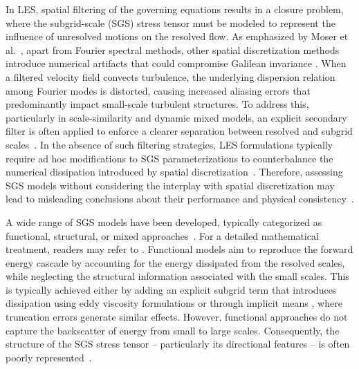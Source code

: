 \documentclass[final,3p]{elsarticle}
\begin{document}
In LES, spatial filtering of the governing equations results in a closure problem, where the subgrid-scale (SGS) stress tensor must be modeled to represent the influence of unresolved motions on the resolved flow. As emphasized by Moser et al.~\cite{moser2021statistical}, apart from Fourier spectral methods, other spatial discretization methods introduce numerical artifacts that could compromise Galilean invariance \cite{moser2021statistical,pletcher2012computational,pope2001turbulent,sagaut2005large}. When a filtered velocity field convects turbulence, the underlying dispersion relation among Fourier modes is distorted, causing increased aliasing errors that predominantly impact small-scale turbulent structures. To address this, particularly in scale-similarity and dynamic mixed models, an explicit secondary filter is often applied to enforce a clearer separation between resolved and subgrid scales~\cite{bardina1983improved, armenio2000lagrangian, zang1993dynamic}. In the absence of such filtering strategies, LES formulations typically require ad hoc modifications to SGS parameterizations to counterbalance the numerical dissipation introduced by spatial discretization~\cite{chow2003further,mosedale2007assessment,thornber2008numerical,chung2009large}. Therefore, assessing SGS models without considering the interplay with spatial discretization may lead to misleading conclusions about their performance and physical consistency~\cite{moser2021statistical,sagaut2005}.

A wide range of SGS models have been developed, typically categorized as functional, structural, or mixed approaches~\cite{sagaut2005}. For a detailed mathematical treatment, readers may refer to \citet{berselli2006mathematics}. Functional models aim to reproduce the forward energy cascade by accounting for the energy dissipated from the resolved scales, while neglecting the structural information associated with the small scales. This is typically achieved either by adding an explicit subgrid term that introduces dissipation using eddy viscosity formulations \cite{smagorinsky1963,ghosal1995dynamic,germano1991dynamic, meneveau1996lagrangian} or through implicit means \cite{grinstein2007implicit}, where truncation errors generate similar effects. However, functional approaches do not capture the backscatter of energy from small to large scales. Consequently, the structure of the SGS stress tensor -- particularly its directional features -- is often poorly represented~\cite{sagaut2005large,bardina1980improved,liu1994properties,tao2002statistical,horiuti2003roles,moser2021statistical}.
\end{document}
